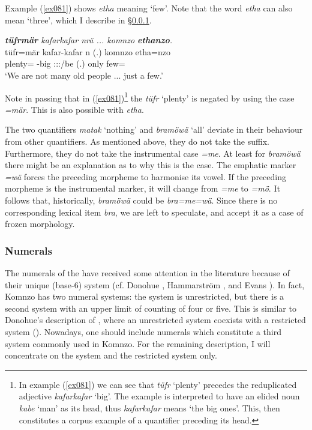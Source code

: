Example (\ref{ex081}) shows \emph{etha} meaning `few'. Note that the word \emph{etha} can also mean `three', which I describe in \S{}\ref{numerals}.

\begin{exe}
	\ex \emph{\textbf{tüfrmär} kafarkafar nrä ... komnzo \textbf{ethanzo}.}\\
	\gll tüfr=mär kafar-kafar n (.) komnzo etha=nzo\\
	plenty=\Priv{} \Redup{}-big \Fpl:\Sbj:\Nonpast:\Ipfv/be (.) only few=\Only{}\\
	\trans `We are not many old people ... just a few.' 
	\label{ex081}
\end{exe}

Note in passing that in (\ref{ex081})\footnote{\label{foot1}In example (\ref{ex081}) we can see that \emph{tüfr} `plenty' precedes the reduplicated adjective \emph{kafarkafar} `big'. The example is interpreted to have an elided noun \emph{kabe} `man' as its head, thus \emph{kafarkafar} means `the big ones'. This, then constitutes a corpus example of a quantifier preceding its head.} the  \emph{tüfr} `plenty' is negated by using the  case \emph{=mär}. This is also possible with \emph{etha}.%

The two quantifiers \emph{matak} `nothing' and \emph{bramöwä} `all' deviate in their behaviour from other quantifiers. As mentioned above, they do not take the  suffix. Furthermore, they do not take the instrumental case \emph{=me}. At least for \emph{bramöwä} there might be an explanation as to why this is the case. The emphatic marker \emph{=wä} forces the preceding morpheme to harmonise its vowel. If the preceding morpheme is the instrumental marker, it will change from \emph{=me} to \emph{=mö}. It follows that, historically, \emph{bramöwä} could be \emph{bra=me=wä}. Since there is no corresponding lexical item \emph{bra}, we are left to speculate, and accept it as a case of frozen morphology.

\subsubsection{Numerals} \label{numerals}

The numerals of the  have received some attention in the literature because of their unique  (base-6) system (cf. Donohue \citeyear{Donohue:2008bn}, Hammarström \citeyear{Hammarstrom:2009bp}, and Evans \citeyear{Evans:2009wg}). In fact, Komnzo has two numeral systems: the  system is unrestricted, but there is a second system with an upper limit of counting of four or five. This is similar to Donohue's description of , where an unrestricted system coexists with a restricted system (\citealt{Donohue:2008bn}). Nowadays, one should include  numerals which constitute a third system commonly used in Komnzo. For the remaining description, I will concentrate on the  system and the restricted system only.%


